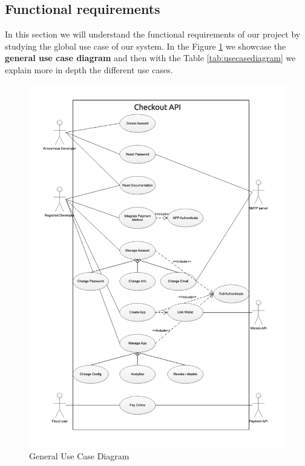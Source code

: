 \begin{spacing}{1.2}
\subsection{Functional requirements}
In this section we will understand the functional requirements of our project by studying the global use case of our system.
	\newline In the Figure \ref{fig:usecasediagram} we showcase the \textbf{general use case diagram} and then with the Table \ref{tab:usecasediagram} we explain more in depth the different use cases.
\begin{figure}[H]\centering
\includegraphics[scale=0.6]{GeneralUseCase.png}
\caption{General Use Case Diagram}
\label{fig:usecasediagram}
\end{figure}


\end{spacing}
